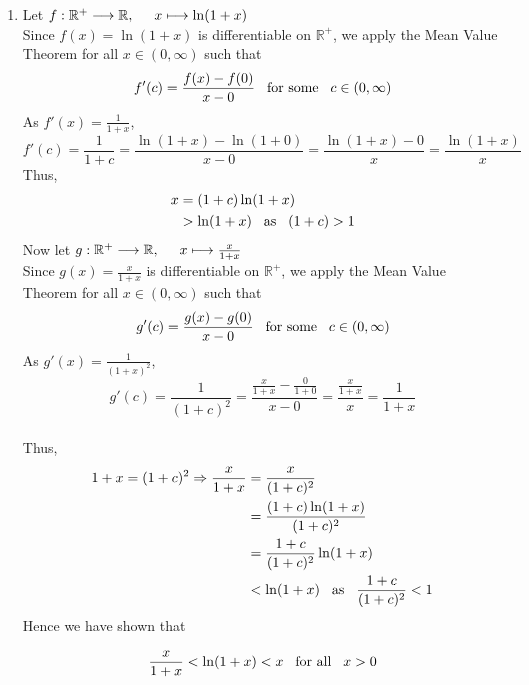 \documentclass[12pt]{amsart}
\begin{document}
\begin{enumerate}
	\item Let $f: \mathbb{R}^+\longrightarrow \mathbb{R},\hspace{0.5cm} x\longmapsto \ln (1+x)$ \\
		Since $f(x) = \ln(1+x)$ is differentiable on $\mathbb{R}^+$, we apply the Mean Value Theorem for 			all $x \in (0,\infty)$ such that
		$$f'(c)=\frac{f(x)-f(0)}{x-0} \hspace{0.3cm} \text{for some} \hspace{0.3cm} c \in (0,\infty)$$
		As $f'(x)=\frac{1}{1+x}$,
		$$f'(c)=\frac{1}{1+c} = \frac{\ln(1+x)-\ln(1+0)}{x-0} = \frac{\ln(1+x)-0}{x} = \frac{\ln(1+x)}{x}$$
		Thus, 
			\begin{align}
				x & = (1+c) \ln(1+x) \notag \\
				& > \ln(1+x) \hspace{0.3cm} \text{as} \hspace{0.3cm} (1+c) > 1 \notag
			\end{align} 
		\medskip
		Now let $g: \mathbb{R}^+\longrightarrow \mathbb{R},\hspace{0.5cm} x\longmapsto \frac{x}{1+x}$ \\
		Since $g(x) = \frac{x}{1+x}$ is differentiable on  $\mathbb{R}^+$, we apply the Mean Value 				Theorem for all $x \in (0,\infty)$ such that
		$$g'(c)=\frac{g(x)-g(0)}{x-0} \hspace{0.3cm} \text{for some} \hspace{0.3cm} c \in (0,\infty)$$
		As $g'(x)=\frac{1}{(1+x)^2}$,
		$$g'(c)=\frac{1}{(1+c)^2} = \frac{\frac{x}{1+x}-\frac{0}{1+0}}{x-0} = \frac{\frac{x}{1+x}}{x} = 
		\frac{1}{1+x}$$\\
		Thus, 
			\begin{align}
				1+x = (1+c)^2 \Rightarrow \frac{x}{1+x} & = \frac{x}{(1+c)^2} \notag \\
				& = \frac{(1+c)\ln(1+x)}{(1+c)^2} \notag \\
				& = \frac{1+c}{(1+c)^2} \ln(1+x) \notag \\
				& < \ln(1+x) \hspace{0.3cm} \text{as} \hspace{0.3cm} \frac{1+c}{(1+c)^2} < 1 \notag
			\end{align}
		Hence we have shown that
		
		$$\frac{x}{1+x} < \ln(1+x) < x \hspace{0.3cm} \text{for all} \hspace{0.3cm} x>0$$
		\smallskip
		

\end{enumerate}
\end{document}
